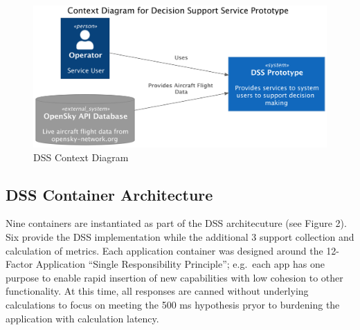 \documentclass[
  letterpaper,
  DIV=11,
  numbers=noendperiod]{scrartcl}
\begin{document}
\begin{figure}

{\centering \includegraphics{dss-span-analysis-rev1_files/figure-pdf/53b3b0c0-d3c0-4526-9cfe-f74946c31414.png}

}

\caption{DSS Context Diagram}

\end{figure}

\hypertarget{dss-container-architecture}{%
\subsection{DSS Container
Architecture}\label{dss-container-architecture}}

Nine containers are instantiated as part of the DSS architecuture (see
Figure 2). Six provide the DSS implementation while the additional 3
support collection and calculation of metrics. Each application
container was designed around the 12-Factor Application ``Single
Responsibility Principle''; e.g.~each app has one purpose to enable
rapid insertion of new capabilities with low cohesion to other
functionality. At this time, all responses are canned without underlying
calculations to focus on meeting the 500 ms hypothesis pryor to
burdening the application with calculation latency.
\end{document}

